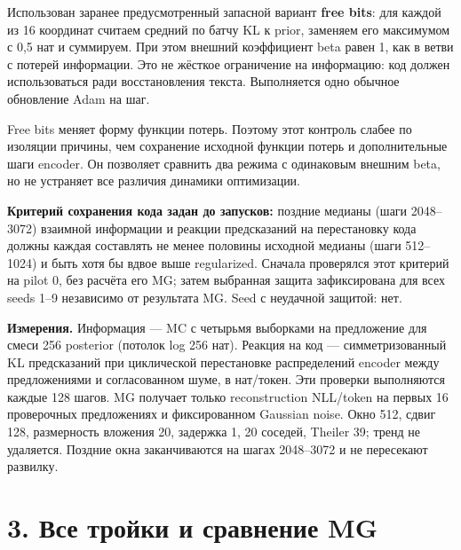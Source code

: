 \documentclass[10pt,a4paper]{article}
\begin{document}
Использован заранее предусмотренный запасной вариант \textbf{free bits}: для каждой из 16 координат считаем средний по батчу KL к prior, заменяем его максимумом с 0,5 нат и суммируем. При этом внешний коэффициент beta равен 1, как в ветви с потерей информации. Это не жёсткое ограничение на информацию: код должен использоваться ради восстановления текста. Выполняется одно обычное обновление Adam на шаг.

Free bits меняет форму функции потерь. Поэтому этот контроль слабее по изоляции причины, чем сохранение исходной функции потерь и дополнительные шаги encoder. Он позволяет сравнить два режима с одинаковым внешним beta, но не устраняет все различия динамики оптимизации.

\textbf{Критерий сохранения кода задан до запусков:} поздние медианы (шаги 2048--3072) взаимной информации и реакции предсказаний на перестановку кода должны каждая составлять не менее половины исходной медианы (шаги 512--1024) и быть хотя бы вдвое выше regularized. Сначала проверялся этот критерий на pilot 0, без расчёта его MG; затем выбранная защита зафиксирована для всех seeds 1--9 независимо от результата MG. Seed с неудачной защитой: нет.

\textbf{Измерения.} Информация --- MC с четырьмя выборками на предложение для смеси 256 posterior (потолок log 256 нат). Реакция на код --- симметризованный KL предсказаний при циклической перестановке распределений encoder между предложениями и согласованном шуме, в нат/токен. Эти проверки выполняются каждые 128 шагов. MG получает только reconstruction NLL/token на первых 16 проверочных предложениях и фиксированном Gaussian noise. Окно 512, сдвиг 128, размерность вложения 20, задержка 1, 20 соседей, Theiler 39; тренд не удаляется. Поздние окна заканчиваются на шагах 2048--3072 и не пересекают развилку.

\newpage

\section*{3. Все тройки и сравнение MG}
\end{document}
